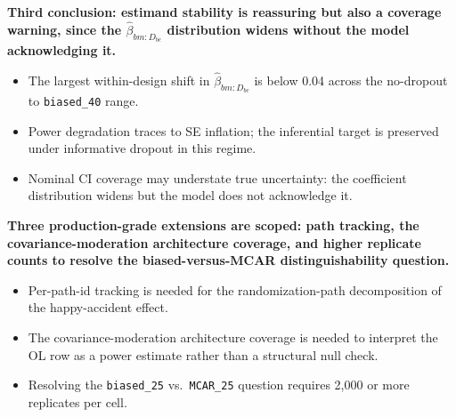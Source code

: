 \documentclass[
  11pt,
]{article}
\begin{document}
\textbf{Third conclusion: estimand stability is reassuring but also a coverage warning, since the $\hat\beta_{bm:D_{bc}}$ distribution widens without the model acknowledging it.}

\begin{itemize}\setlength{\itemsep}{2pt}\setlength{\parskip}{0pt}
\item The largest within-design shift in $\hat\beta_{bm:D_{bc}}$ is below 0.04 across the no-dropout to \texttt{biased\_40} range.
\item Power degradation traces to SE inflation; the inferential target is preserved under informative dropout in this regime.
\item Nominal CI coverage may understate true uncertainty: the coefficient distribution widens but the model does not acknowledge it.
\end{itemize}

\textbf{Three production-grade extensions are scoped: path tracking, the covariance-moderation architecture coverage, and higher replicate counts to resolve the biased-versus-MCAR distinguishability question.}

\begin{itemize}\setlength{\itemsep}{2pt}\setlength{\parskip}{0pt}
\item Per-path-id tracking is needed for the randomization-path decomposition of the happy-accident effect.
\item The covariance-moderation architecture coverage is needed to interpret the OL row as a power estimate rather than a structural null check.
\item Resolving the \texttt{biased\_25} vs.\ \texttt{MCAR\_25} question requires 2,000 or more replicates per cell.
\end{itemize}
\end{document}
